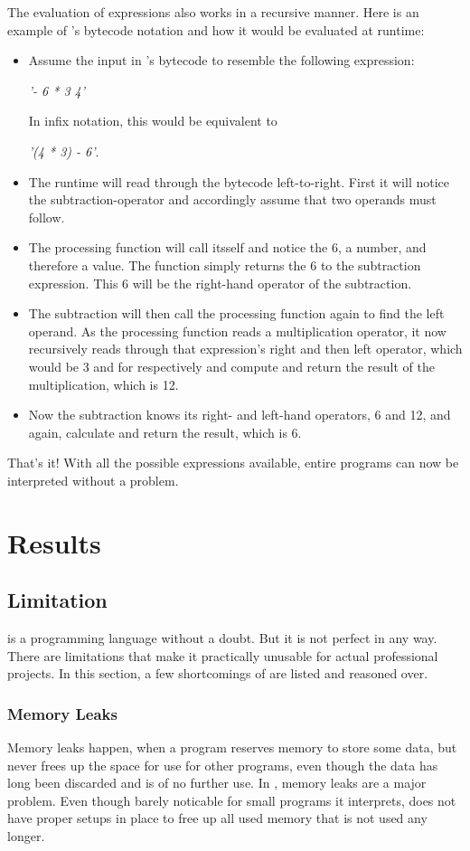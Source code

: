 \documentclass[12pt,a4paper,man]{apa7}
\newcommand{\expr}[1] {
    \begin{center}
        #1
    \end{center}
}
\begin{document}
The evaluation of expressions also works in a recursive manner. Here is an 
example of \name's bytecode notation and how it would be evaluated at runtime:
\begin{itemize}
    \item Assume the input in \name's bytecode to resemble the following expression: 
        \expr{\emph{'- 6 * 3 4'}}
        In infix notation, this would be equivalent to 
        \expr{\emph{'(4 * 3) - 6'}.}
    \item The runtime will read through the bytecode left-to-right. First it will
        notice the subtraction-operator and accordingly assume that two
        operands must follow.
    \item The processing function will call itsself
        and notice the 6, a number, and therefore a value. The function simply returns the 6
        to the subtraction expression. This 6 will be the right-hand operator
        of the subtraction.
    \item The subtraction will then call the processing function again to find
        the left operand. As the processing function reads a multiplication operator,
        it now recursively reads through that expression's right and then left
        operator, which would be 3 and for respectively and compute and return
        the result of the multiplication, which is 12.
    \item Now the subtraction knows its right- and left-hand operators, 6 and 12,
        and again, calculate and return the result, which is 6.
\end{itemize}

That's it! With all the possible expressions available, entire programs
can now be interpreted without a problem.

\section{Results}
\subsection{Limitation}
\name is a programming language without a doubt. But it is not perfect in any
way. There are limitations that make it practically unusable for actual
professional projects. In this section, a few shortcomings of \name are listed
and reasoned over.

\subsubsection{Memory Leaks}
Memory leaks happen, when a program reserves memory to store some data, but
never frees up the space for use for other programs, even though the data
has long been discarded and is of no further use.
In \name, memory leaks are a major problem. Even though barely noticable for small
programs it interprets, \name does not have proper setups in place to free up
all used memory that is not used any longer.
\end{document}
